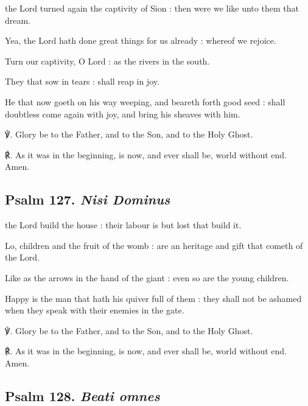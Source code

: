 \begin{multicols}{2}
 the Lord turned again the captivity of Sion : then were we like unto them that dream.\par
{}
Yea, the Lord hath done great things for us already : whereof we rejoice.\par
{}Turn our captivity, O Lord : as the rivers in the south.\par
{}They that sow in tears : shall reap in joy.\par
{}He that now goeth on his way weeping, and beareth forth good seed : shall doubtless come again with joy, and bring his sheaves with him.\par
℣. Glory be to the Father, and to the Son, and to the Holy Ghost.\par
℟. As it was in the beginning, is now, and ever shall be, world without end. Amen.

\subsection{Psalm 127. \textit{Nisi Dominus}}

 the Lord build the house : their labour is but lost that build it.\par
{}
Lo, children and the fruit of the womb : are an heritage and gift that cometh of the Lord.\par
{}Like as the arrows in the hand of the giant : even so are the young children.\par
{}Happy is the man that hath his quiver full of them : they shall not be ashamed when they speak with their enemies in the gate.\par
℣. Glory be to the Father, and to the Son, and to the Holy Ghost.\par
℟. As it was in the beginning, is now, and ever shall be, world without end. Amen.

\subsection{Psalm 128. \textit{Beati omnes}}


\end{multicols}
